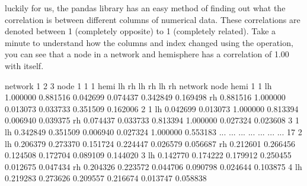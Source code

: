 \documentclass[letterpaper,10pt,english]{jupyterBook}
\begin{document}
\sphinxAtStartPar
luckily for us, the pandas library has an easy method of finding out what the correlation is between different columns of numerical data.
These correlations are denoted between \sphinxhyphen{}1 (completely opposite) to 1 (completely related).
Take a minute to understand how the columns and index changed using the operation, you can see that a node in a network and hemisphere has a correlation of 1.00 with itself.

\begin{sphinxVerbatim}[commandchars=\\\{\}]
\end{sphinxVerbatim}

\begin{sphinxVerbatim}[commandchars=\\\{\}]
network                   1                   2                   3            \PYGZbs{}
node                      1                   1                   1             
hemi                     lh        rh        lh        rh        lh        rh   
network node hemi                                                               
1       1    lh    1.000000  0.881516 \PYGZhy{}0.042699 \PYGZhy{}0.074437 \PYGZhy{}0.342849 \PYGZhy{}0.169498   
             rh    0.881516  1.000000  0.013073  0.033733 \PYGZhy{}0.351509 \PYGZhy{}0.162006   
2       1    lh   \PYGZhy{}0.042699  0.013073  1.000000  0.813394 \PYGZhy{}0.006940 \PYGZhy{}0.039375   
             rh   \PYGZhy{}0.074437  0.033733  0.813394  1.000000 \PYGZhy{}0.027324 \PYGZhy{}0.023608   
3       1    lh   \PYGZhy{}0.342849 \PYGZhy{}0.351509 \PYGZhy{}0.006940 \PYGZhy{}0.027324  1.000000  0.553183   
...                     ...       ...       ...       ...       ...       ...   
17      2    lh   \PYGZhy{}0.206379 \PYGZhy{}0.273370 \PYGZhy{}0.151724 \PYGZhy{}0.224447  0.026579 \PYGZhy{}0.056687   
             rh   \PYGZhy{}0.212601 \PYGZhy{}0.266456 \PYGZhy{}0.124508 \PYGZhy{}0.172704 \PYGZhy{}0.089109 \PYGZhy{}0.144020   
        3    lh   \PYGZhy{}0.142770 \PYGZhy{}0.174222 \PYGZhy{}0.179912 \PYGZhy{}0.250455 \PYGZhy{}0.012675 \PYGZhy{}0.047434   
             rh   \PYGZhy{}0.204326 \PYGZhy{}0.223572 \PYGZhy{}0.044706 \PYGZhy{}0.090798 \PYGZhy{}0.024644 \PYGZhy{}0.103875   
        4    lh   \PYGZhy{}0.219283 \PYGZhy{}0.273626 \PYGZhy{}0.209557 \PYGZhy{}0.216674  0.013747 \PYGZhy{}0.058838   


\end{sphinxVerbatim}
\end{document}
